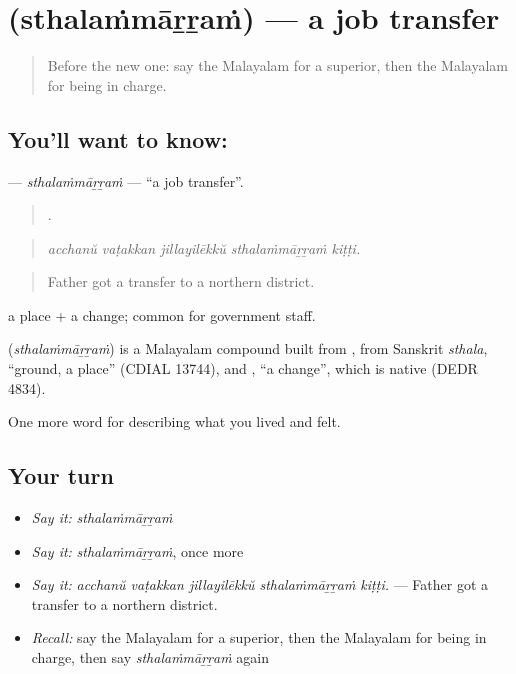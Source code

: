 \section[\texorpdfstring{\ml{സ്ഥലംമാറ്റം} (sthalaṁmāṟṟaṁ)}{സ്ഥലംമാറ്റം (sthalaṁmāṟṟaṁ)}]{ (sthalaṁmāṟṟaṁ) — a job transfer}

\label{lesson:ML-C545-sthalammarram}



\begin{quote}
Before the new one: say the Malayalam for a superior, then the Malayalam for being in charge.
\end{quote}

\subsection*{You'll want to know: }
\textbf{} — \emph{sthalaṁmāṟṟaṁ} — \textquotedblleft{}a job transfer\textquotedblright{}.

\begin{quote}
    .
\end{quote}

\begin{quote}
\emph{acchanŭ vaṭakkan jillayilēkkŭ sthalaṁmāṟṟaṁ kiṭṭi.}
\end{quote}

\begin{quote}
Father got a transfer to a northern district.
\end{quote}

 a place +  a change; common for government staff.

\begin{cousinweb}
\textbf{} (\emph{sthalaṁmāṟṟaṁ}) is a Malayalam compound built from , from Sanskrit \emph{sthala}, \textquotedblleft{}ground, a place\textquotedblright{} (CDIAL 13744), and , \textquotedblleft{}a change\textquotedblright{}, which is native (DEDR 4834).
\end{cousinweb}

\begin{grammarlens}[title={What you've built}]
One more word for describing what you lived and felt.
\end{grammarlens}

\subsection*{Your turn}
\begin{itemize}
\raggedright
  \item \emph{Say it:} \emph{sthalaṁmāṟṟaṁ}
  \item \emph{Say it:} \emph{sthalaṁmāṟṟaṁ}, once more
  \item \emph{Say it:} \emph{acchanŭ vaṭakkan jillayilēkkŭ sthalaṁmāṟṟaṁ kiṭṭi.} — Father got a transfer to a northern district.
  \item \emph{Recall:} say the Malayalam for a superior, then the Malayalam for being in charge, then say \emph{sthalaṁmāṟṟaṁ} again
\end{itemize}

